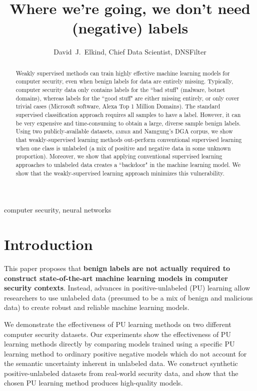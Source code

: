 \documentclass[conference]{IEEEtran}
\begin{document}
\title{Where we're going, we don't need (negative) labels}

\author{David~J.~Elkind, Chief Data Scientist, DNSFilter}

\maketitle

\begin{abstract}
    Weakly supervised methods can train highly effective machine learning models for computer security, even when benign labels for data are entirely missing. Typically, computer security data only contains labels for the ``bad stuff" (malware, botnet domains), whereas labels for the ``good stuff" are either missing entirely, or only cover trivial cases (Microsoft software, Alexa Top 1 Million Domains). The standard supervised classification approach requires all samples to have a label. However, it can be very expensive and time-consuming to obtain a large, diverse sample benign labels. Using two publicly-available datasets, \textsc{ember} and Namgung's DGA corpus, we show that weakly-supervised learning methods out-perform conventional supervised learning when one class is unlabeled (a mix of positive and negative data in some unknown proportion). Moreover, we show that applying conventional supervised learning approaches to unlabeled data creates a ``backdoor" in the machine learning model. We show that the weakly-supervised learning approach minimizes this vulnerability.
\end{abstract}

\begin{IEEEkeywords}
computer security, neural networks
\end{IEEEkeywords}

\section{Introduction}
    This paper proposes that \textbf{benign labels are not actually required to construct state-of-the-art machine learning models in computer security contexts}. Instead, advances in positive-unlabeled (PU) learning allow researchers to use unlabeled data (presumed to be a mix of benign and malicious data) to create robust and reliable machine learning models.

    We demonstrate the effectiveness of PU learning methods on two different computer security datasets. Our experiments show the effectiveness of PU learning methods directly by comparing models trained using a specific PU learning method to ordinary positive negative models which do not account for the semantic uncertainty inherent in unlabeled data. We construct synthetic positive-unlabeled datasets from real-world security data, and show that the chosen PU learning method produces high-quality models.
\end{document}
